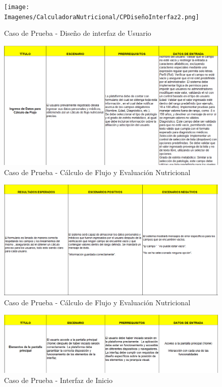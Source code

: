 \documentclass[12pt,letterpaper,spanish, xcolor=table]{report}
\numberwithin{figure}{subsection}
\begin{document}
	\begin{figure}[H]
		\centering
		\texttt{[image: Imagenes/CalculadoraNutricional/CPDiseñoInterfaz2.png]}
		\caption{Caso de Prueba - Diseño de interfaz de Usuario
		}\label{a2}
	\end{figure}
	
	\begin{figure}[H]
		\centering
		\includegraphics[width=1.0\textwidth]
		{Imagenes/CalculadoraNutricional/CPCalculadora.png}
		\caption{Caso de Prueba - Cálculo de Flujo y Evaluación Nutricional
		}\label{a2}
	\end{figure}
	
	\begin{figure}[H]
		\centering
		\includegraphics[width=1.0\textwidth]
		{Imagenes/CalculadoraNutricional/CPCalculo2.png}
		\caption{Caso de Prueba - Cálculo de Flujo y Evaluación Nutricional
		}\label{a2}
	\end{figure}

	\begin{figure}[H]
		\centering
		\includegraphics[width=1.0\textwidth]
		{Imagenes/CalculadoraNutricional/CPInicio.png}
		\caption{Caso de Prueba - Interfaz de Inicio
		}\label{a2}
	\end{figure}
	
\end{document}
